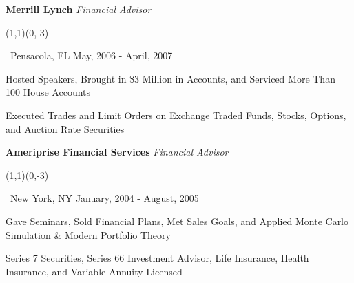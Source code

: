 \documentclass[letterpaper,10pt]{article}
\newcommand{\sbullet}{\,\begin{picture}(1,1)(0,-3)\circle*{3}\end{picture}\ }
\begin{document}
\vspace{-1mm}
{\addtolength{\leftskip}{0mm} \textbf{Merrill Lynch} \emph{Financial Advisor} 
\sbullet Pensacola, FL \hfill{} May, 2006 - April, 2007

\vspace{-2mm} {\addtolength{\leftskip}{0mm}
\begin{itemize}\setlength{\itemsep}{0cm}\setlength{\parskip}{0cm} {\addtolength{\leftskip}{-5mm}
  \item Hosted Speakers, Brought in \$3 Million in Accounts, and Serviced More Than 100 House Accounts
  \item Executed Trades and Limit Orders on Exchange Traded Funds, Stocks, Options, and Auction Rate Securities

}
\end{itemize}

}}

\vspace{-1mm}
{\addtolength{\leftskip}{0mm} \textbf{Ameriprise Financial Services} \emph{Financial Advisor} 
\sbullet New York, NY \hfill{} January, 2004 - August, 2005

\vspace{-2mm} {\addtolength{\leftskip}{0mm}
\begin{itemize}\setlength{\itemsep}{0cm}\setlength{\parskip}{0cm} {\addtolength{\leftskip}{-5mm}
  \item Gave Seminars, Sold Financial Plans, Met Sales Goals, and Applied Monte Carlo Simulation \& Modern Portfolio Theory
  \item Series 7 Securities, Series 66 Investment Advisor, Life Insurance, Health Insurance, and Variable Annuity Licensed

}
\end{itemize}

}}
\end{document}
